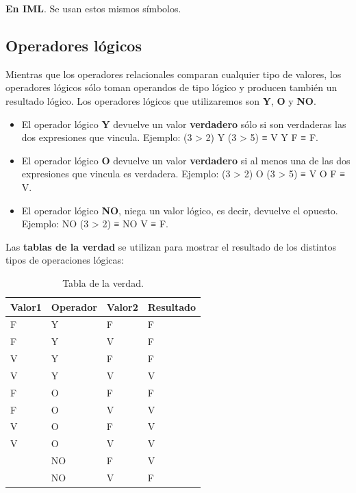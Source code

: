 \documentclass[]{book}
\providecommand{\tightlist}{%
  \setlength{\itemsep}{0pt}\setlength{\parskip}{0pt}}
\begin{document}
\textbf{En IML}. Se usan estos mismos símbolos.

\hypertarget{operadores-logicos}{%
\subsection{Operadores lógicos}\label{operadores-logicos}}

Mientras que los operadores relacionales comparan cualquier tipo de valores, los operadores lógicos sólo toman operandos de tipo lógico y producen también un resultado lógico. Los operadores lógicos que utilizaremos son \textbf{Y}, \textbf{O} y \textbf{NO}.

\begin{itemize}
\tightlist
\item
  El operador lógico \textbf{Y} devuelve un valor \textbf{verdadero} sólo si son verdaderas las dos expresiones que vincula. Ejemplo: (3 \textgreater{} 2) Y (3 \textgreater{} 5) ≡ V Y F ≡ F.
\item
  El operador lógico \textbf{O} devuelve un valor \textbf{verdadero} si al menos una de las dos expresiones que vincula es verdadera. Ejemplo: (3 \textgreater{} 2) O (3 \textgreater{} 5) ≡ V O F ≡ V.
\item
  El operador lógico \textbf{NO}, niega un valor lógico, es decir, devuelve el opuesto. Ejemplo: NO (3 \textgreater{} 2) ≡ NO V ≡ F.
\end{itemize}

Las \textbf{tablas de la verdad} se utilizan para mostrar el resultado de los distintos tipos de operaciones lógicas:

\begin{table}[t]

\caption{\label{tab:unnamed-chunk-16}Tabla de la verdad.}
\centering
\begin{tabular}{l|l|l|l}
\hline
Valor1 & Operador & Valor2 & Resultado\\
\hline
F & Y & F & F\\
\hline
F & Y & V & F\\
\hline
V & Y & F & F\\
\hline
V & Y & V & V\\
\hline
F & O & F & F\\
\hline
F & O & V & V\\
\hline
V & O & F & V\\
\hline
V & O & V & V\\
\hline
 & NO & F & V\\
\hline
 & NO & V & F\\
\hline
\end{tabular}
\end{table}
\end{document}

